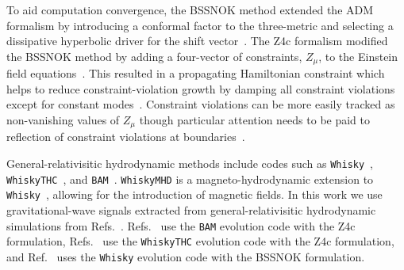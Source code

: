 \documentclass[../Thesis.tex]{subfiles}
\begin{document}
    To aid computation convergence, the BSSNOK method extended the ADM formalism by introducing a conformal factor to the three-metric and selecting a dissipative hyperbolic driver for the  shift vector~\cite{Nakamura1987,Shibata1995,Nakamura1999,Shibata1999,Baumgarte1999,Alcubierre2000,Alcubierre2001}. %
    The Z4c formalism modified the BSSNOK method by adding a four-vector of constraints, $Z_\mu$, to the Einstein field equations~\cite{Bona2003,Bona2004,Gundlach2005,Bernuzzi2010,Hilditch2013}. 
    This resulted in a propagating Hamiltonian constraint which helps to reduce constraint-violation growth by damping all constraint violations  except for constant modes~\cite{Gundlach2005}.
    Constraint violations can be more easily tracked as non-vanishing values of $Z_\mu$ though particular attention needs to be paid to reflection of constraint violations at boundaries~\cite{Bernuzzi2010,Ruiz2011,Hilditch2013}.  \par
    
    

    
    General-relativisitic hydrodynamic methods include codes such as \texttt{Whisky}~\cite{Baiotti2005}, \texttt{WhiskyTHC}~\cite{Baiotti2005,Radice2014,Radice2014b,Radice2015}, and \texttt{BAM}~\cite{Brugmann2004,Brugmann2008,Thierfelder2011,Dietrich2015,Bernuzzi2016b,Dietrich2019a}. 
    \texttt{WhiskyMHD} is a magneto-hydrodynamic extension to \texttt{Whisky}~\cite{Giacomazzo2007,Giacomazzo2011,Giacomazzo2013}, allowing for the introduction of magnetic fields.
    In this work we use gravitational-wave signals extracted from general-relativisitic hydrodynamic simulations from Refs.~\cite{Bernuzzi2014,Rezzolla2016,Radice2016,Dietrich2017b,Radice2017,Radice2017a,Radice2018,Dietrich2018}. 
    Refs.~\cite{Bernuzzi2014,Dietrich2017b} use the \texttt{BAM}  evolution code with the Z4c formulation, Refs.~\cite{Radice2016,Radice2017,Radice2017a,Radice2018} use the \texttt{WhiskyTHC} evolution code with the Z4c formulation, and Ref.~\cite{Rezzolla2016} uses the \texttt{Whisky} evolution code with the BSSNOK formulation. \par 
\end{document}
